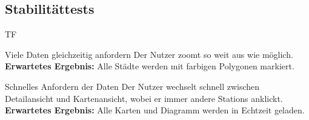 \subsection{Stabilitättests}
\begin{Kriterien}{TF}

	\item[Viele Daten gleichzeitig anfordern] Der Nutzer zoomt so weit aus wie möglich.\\ \textbf{Erwartetes Ergebnis:} Alle Städte werden mit farbigen Polygonen markiert.

	\item[Schnelles Anfordern der Daten] Der Nutzer wechselt schnell zwischen Detailansicht und Kartenansicht, wobei er immer andere \glspl{Station} anklickt. \\ \textbf{Erwartetes Ergebnis:} Alle Karten und Diagramm werden in Echtzeit geladen.

\end{Kriterien}

